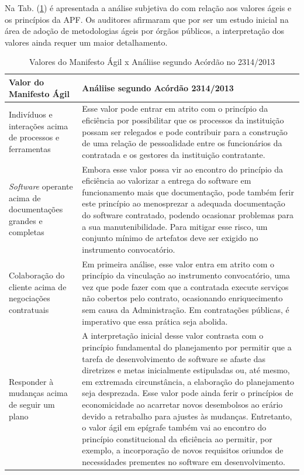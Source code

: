 Na Tab. (\ref{ageisapf}) é apresentada a análise subjetiva do  com relação aos valores ágeis e os princípios da APF. Os auditores afirmaram que por ser um estudo inicial na área de adoção de metodologias ágeis por órgãos públicos, a interpretação dos valores ainda requer um maior detalhamento.

\begin{table}[H]
\center
\footnotesize
\begin{tabular}{|p{6cm}|p{6cm}|}
  \hline
   \textbf{Valor do Manifesto Ágil} & \textbf{Análiise segundo Acórdão 2314/2013 }\\
    \hline
  Indivíduos e interações acima de processos e ferramentas &  Esse valor pode entrar em atrito com o princípio da eficiência
por possibilitar que os processos da instituição possam
ser relegados e pode contribuir para a construção
de uma relação de pessoalidade entre os funcionários da
contratada e os gestores da instituição contratante. \\
   \hline    
 \textit{Software} operante acima de documentações grandes e completas & Embora esse valor possa vir ao encontro do princípio da
eficiência ao valorizar a entrega
do software em funcionamento mais que documentação, pode também ferir este princípio ao menosprezar a adequada documentação do software
contratado, podendo ocasionar problemas para a sua
manutenibilidade. Para mitigar esse risco, um conjunto
mínimo de artefatos deve ser exigido no instrumento
convocatório.\\
    \hline
  Colaboração do cliente acima de negociações contratuais &  Em primeira análise, esse valor entra em atrito com
o princípio da vinculação ao instrumento convocatório,
uma vez que pode fazer com que a contratada execute
serviços não cobertos pelo contrato, ocasionando enriquecimento
sem causa da Administração. Em contratações
públicas, é imperativo que essa prática seja abolida.\\
   \hline
  Responder à mudanças acima de seguir um plano & A interpretação inicial desse valor contrasta com o princípio
fundamental do planejamento por permitir que a
tarefa de desenvolvimento de software se afaste das diretrizes
e metas inicialmente estipuladas ou, até mesmo,
em extremada circunstância, a elaboração do planejamento
seja desprezada. Esse valor pode ainda ferir o princípios de economicidade ao acarretar novos desembolsos ao erário devido a retrabalho para ajustes às mudanças. Entretanto, o valor ágil em epígrafe
também vai ao encontro do princípio constitucional
da eficiência ao permitir, por exemplo, a incorporação de
novos requisitos oriundos de necessidades prementes no
software em desenvolvimento.\\
   \hline
\end{tabular}
\caption{Valores do Manifesto Ágil x Análiise segundo Acórdão no 2314/2013 }
\label{ageisapf}
\end{table}



